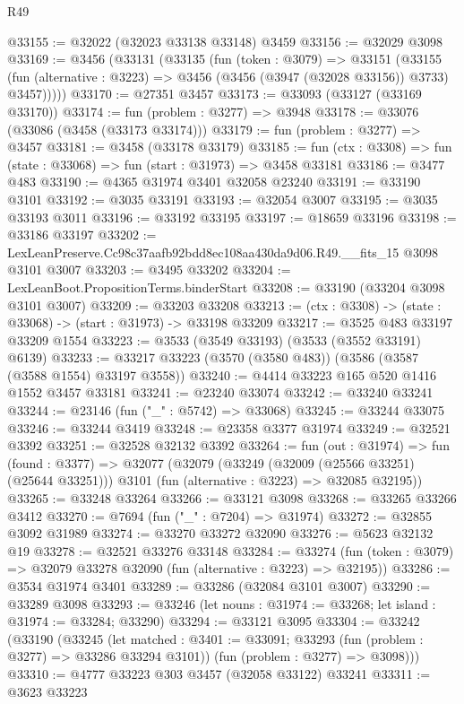 \begin{lexlean}{R49}
\begin{coremodule}
@33155 := @32022 (@32023 @33138 @33148) @3459
@33156 := @32029 @3098
@33169 := @3456
    (@33131
      (@33135
        (fun (token : @3079) =>
        @33151
          (@33155
            (fun (alternative : @3223) => @3456 (@3456 (@3947 (@32028 @33156)) @3733) @3457)))))
@33170 := @27351 @3457
@33173 := @33093 (@33127 (@33169 @33170))
@33174 := fun (problem : @3277) => @3948
@33178 := @33076 (@33086 (@3458 (@33173 @33174)))
@33179 := fun (problem : @3277) => @3457
@33181 := @3458 (@33178 @33179)
@33185 := fun (ctx : @3308) => fun (state : @33068) => fun (start : @31973) => @3458 @33181
@33186 := @3477 @483
@33190 := @4365 @31974 @3401 @32058 @23240
@33191 := @33190 @3101
@33192 := @3035 @33191
@33193 := @32054 @3007
@33195 := @3035 @33193 @3011
@33196 := @33192 @33195
@33197 := @18659 @33196
@33198 := @33186 @33197
@33202 := LexLeanPreserve.Cc98c37aafb92bdd8ec108aa430da9d06.R49.__fits_15 @3098 @3101 @3007
@33203 := @3495 @33202
@33204 := LexLeanBoot.PropositionTerms.binderStart
@33208 := @33190 (@33204 @3098 @3101 @3007)
@33209 := @33203 @33208
@33213 := (ctx : @3308) -> (state : @33068) -> (start : @31973) -> @33198 @33209
@33217 := @3525 @483 @33197 @33209 @1554
@33223 := @3533 (@3549 @33193) (@3533 (@3552 @33191) @6139)
@33233 := @33217 @33223 (@3570 (@3580 @483)) (@3586 (@3587 (@3588 @1554) @33197 @3558))
@33240 := @4414 @33223 @165 @520 @1416 @1552 @3457 @33181
@33241 := @23240 @33074
@33242 := @33240 @33241
@33244 := @23146 (fun ("_" : @5742) => @33068)
@33245 := @33244 @33075
@33246 := @33244 @3419
@33248 := @23358 @3377 @31974
@33249 := @32521 @3392
@33251 := @32528 @32132 @3392
@33264 := fun (out : @31974) =>
  fun (found : @3377) =>
  @32077
    (@32079
      (@33249 (@32009 (@25566 @33251) (@25644 @33251)))
      @3101
      (fun (alternative : @3223) => @32085 @32195))
@33265 := @33248 @33264
@33266 := @33121 @3098
@33268 := @33265 @33266 @3412
@33270 := @7694 (fun ("_" : @7204) => @31974)
@33272 := @32855 @3092 @31989
@33274 := @33270 @33272 @32090
@33276 := @5623 @32132 @19
@33278 := @32521 @33276 @33148
@33284 := @33274 (fun (token : @3079) => @32079 @33278 @32090 (fun (alternative : @3223) => @32195))
@33286 := @3534 @31974 @3401
@33289 := @33286 (@32084 @3101 @3007)
@33290 := @33289 @3098
@33293 := @33246 (let nouns : @31974 := @33268; let island : @31974 := @33284; @33290)
@33294 := @33121 @3095
@33304 := @33242
    (@33190
      (@33245
        (let matched : @3401 := @33091; @33293 (fun (problem : @3277) => @33286 @33294 @3101))
        (fun (problem : @3277) => @3098)))
@33310 := @4777 @33223 @303 @3457 (@32058 @33122) @33241
@33311 := @3623 @33223

\end{coremodule}
\end{lexlean}
